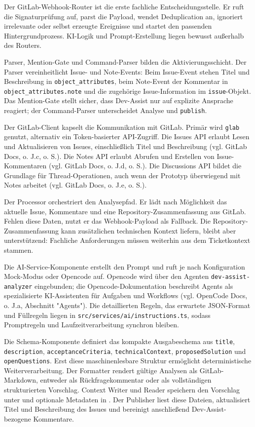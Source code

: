 \documentclass[12pt,a4paper,oneside]{scrreprt}
\begin{document}
Der GitLab-Webhook-Router ist die erste fachliche Entscheidungsstelle. Er ruft die Signaturprüfung auf, parst die Payload, wendet Deduplication an, ignoriert irrelevante oder selbst erzeugte Ereignisse und startet den passenden Hintergrundprozess. KI-Logik und Prompt-Erstellung liegen bewusst außerhalb des Routers.

Parser, Mention-Gate und Command-Parser bilden die Aktivierungsschicht. Der Parser vereinheitlicht Issue- und Note-Events: Beim Issue-Event stehen Titel und Beschreibung in \texttt{object\_attributes}, beim Note-Event der Kommentar in \texttt{object\_attributes.note} und die zugehörige Issue-Information im \texttt{issue}-Objekt. Das Mention-Gate stellt sicher, dass Dev-Assist nur auf explizite Ansprache reagiert; der Command-Parser unterscheidet Analyse und \texttt{publish}.

Der GitLab-Client kapselt die Kommunikation mit GitLab. Primär wird \texttt{glab} genutzt, alternativ ein Token-basierter API-Zugriff. Die Issues API erlaubt Lesen und Aktualisieren von Issues, einschließlich Titel und Beschreibung (vgl. GitLab Docs, o. J.c, o. S.). Die Notes API erlaubt Abrufen und Erstellen von Issue-Kommentaren (vgl. GitLab Docs, o. J.d, o. S.). Die Discussions API bildet die Grundlage für Thread-Operationen, auch wenn der Prototyp überwiegend mit Notes arbeitet (vgl. GitLab Docs, o. J.e, o. S.).

Der Processor orchestriert den Analysepfad. Er lädt nach Möglichkeit das aktuelle Issue, Kommentare und eine Repository-Zusammenfassung aus GitLab. Fehlen diese Daten, nutzt er das Webhook-Payload als Fallback. Die Repository-Zusammenfassung kann zusätzlichen technischen Kontext liefern, bleibt aber unterstützend: Fachliche Anforderungen müssen weiterhin aus dem Ticketkontext stammen.

Die AI-Service-Komponente erstellt den Prompt und ruft je nach Konfiguration Mock-Modus oder Opencode auf. Opencode wird über den Agenten \texttt{dev-assist-analyzer} eingebunden; die Opencode-Dokumentation beschreibt Agents als spezialisierte KI-Assistenten für Aufgaben und Workflows (vgl. OpenCode Docs, o. J.a, Abschnitt "Agents"). Die detaillierten Regeln, das erwartete JSON-Format und Füllregeln liegen in \texttt{src/services/ai/instructions.ts}, sodass Promptregeln und Laufzeitverarbeitung synchron bleiben.

Die Schema-Komponente definiert das kompakte Ausgabeschema aus \texttt{title}, \texttt{description}, \texttt{acceptanceCriteria}, \texttt{technicalContext}, \texttt{proposedSolution} und \texttt{openQuestions}. Erst diese maschinenlesbare Struktur ermöglicht deterministische Weiterverarbeitung. Der Formatter rendert gültige Analysen als GitLab-Markdown, entweder als Rückfragekommentar oder als vollständigen strukturierten Vorschlag. Context Writer und Reader speichern den Vorschlag unter  und optionale Metadaten in . Der Publisher liest diese Dateien, aktualisiert Titel und Beschreibung des Issues und bereinigt anschließend Dev-Assist-bezogene Kommentare.
\end{document}
